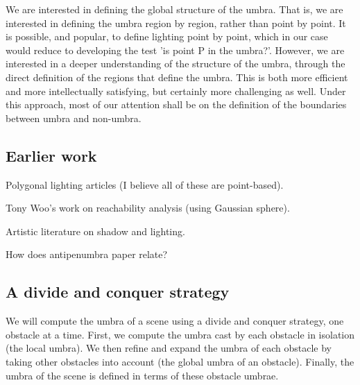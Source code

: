 \documentclass[12pt]{article}
\newif\ifTalk
\begin{document}
We are interested in defining the global structure of the umbra.
That is, we are interested in defining the umbra region by region,
rather than point by point.
It is possible, and popular, to define lighting point by point,
which in our case would reduce to developing the test
'is point P in the umbra?'.
However, we are interested in a deeper understanding of the structure of the umbra,
through the direct definition of the regions that define the umbra.
This is both more efficient and more intellectually satisfying,
but certainly more challenging as well.
Under this approach, most of our attention shall be on the definition of the
boundaries between umbra and non-umbra.

\ifTalk
This distinction between point and regional approaches is analogous to the 
two ways for computing a tangent on a Bezier curve:
computing the tangent at a point
or computing the hodograph of the curve, representing all of the tangents.)
\fi


{\tiny
\subsection{Earlier work}

Polygonal lighting articles (I believe all of these are point-based).

Tony Woo's work on reachability analysis (using Gaussian sphere).

Artistic literature on shadow and lighting.

How does antipenumbra paper relate?
}	%

\clearpage


\subsection{A divide and conquer strategy}

We will compute the umbra of a scene using a divide and conquer strategy,
one obstacle at a time.
First, we compute the umbra cast by each obstacle in isolation
(the local umbra).
We then refine and expand the umbra of each obstacle
by taking other obstacles into account (the global umbra of an obstacle).
Finally, the umbra of the scene is defined in terms of these obstacle umbrae.
\end{document}
